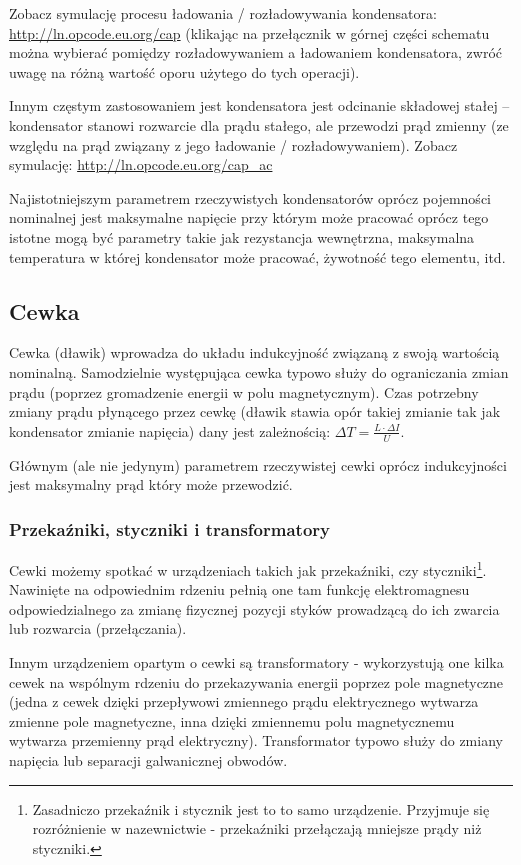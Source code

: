 Zobacz symulację procesu ładowania / rozładowywania kondensatora: \url{http://ln.opcode.eu.org/cap}
(klikając na przełącznik w górnej części schematu  można wybierać pomiędzy rozładowywaniem a ładowaniem kondensatora, zwróć uwagę na różną wartość oporu użytego do tych operacji).

Innym częstym zastosowaniem jest kondensatora jest odcinanie składowej stałej – kondensator stanowi rozwarcie dla prądu stałego, ale przewodzi prąd zmienny (ze względu na prąd związany z jego ładowanie / rozładowywaniem).
Zobacz symulację: \url{http://ln.opcode.eu.org/cap_ac}

Najistotniejszym parametrem rzeczywistych kondensatorów oprócz pojemności nominalnej jest maksymalne napięcie przy którym może pracować oprócz tego istotne mogą być parametry takie jak rezystancja wewnętrzna, maksymalna temperatura w której kondensator może pracować, żywotność tego elementu, itd.

\subsection{Cewka}

Cewka (dławik) wprowadza do układu indukcyjność związaną z swoją wartością nominalną. Samodzielnie występująca cewka typowo służy do ograniczania zmian prądu (poprzez gromadzenie energii w polu magnetycznym). Czas potrzebny zmiany prądu płynącego przez cewkę (dławik stawia opór takiej zmianie tak jak kondensator zmianie napięcia) dany jest zależnością: $\Delta T = \frac{L \cdot \Delta I}{U}$.

Głównym (ale nie jedynym) parametrem rzeczywistej cewki oprócz indukcyjności jest maksymalny prąd który może przewodzić.

\subsubsection{Przekaźniki, styczniki i transformatory}

Cewki możemy spotkać w urządzeniach takich jak przekaźniki, czy styczniki\footnote{Zasadniczo przekaźnik i stycznik jest to to samo urządzenie. Przyjmuje się rozróżnienie w nazewnictwie - przekaźniki przełączają mniejsze prądy niż styczniki.}.
Nawinięte na odpowiednim rdzeniu pełnią one tam funkcję elektromagnesu odpowiedzialnego za zmianę fizycznej pozycji styków prowadzącą do ich zwarcia lub rozwarcia (przełączania).

Innym urządzeniem opartym o cewki są transformatory - wykorzystują one kilka cewek na wspólnym rdzeniu do przekazywania energii poprzez pole magnetyczne (jedna z cewek dzięki przepływowi zmiennego prądu elektrycznego wytwarza zmienne pole magnetyczne, inna dzięki zmiennemu polu magnetycznemu wytwarza przemienny prąd elektryczny). Transformator typowo służy do zmiany napięcia lub separacji galwanicznej obwodów.

